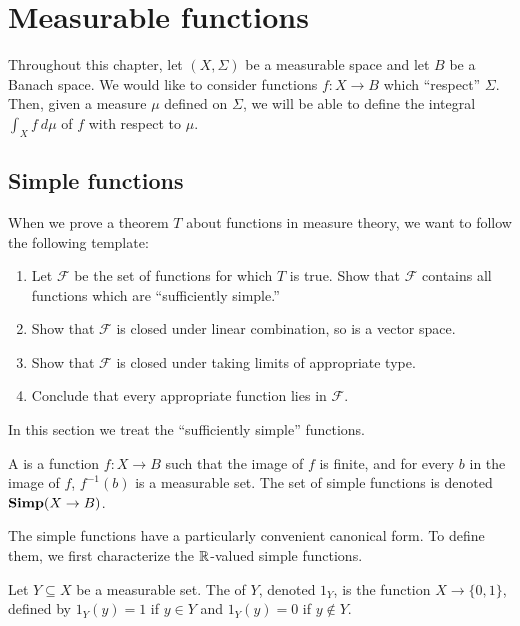 \chapter{Measurable functions}
Throughout this chapter, let $(X, \Sigma)$ be a measurable space and let $B$ be a Banach space.
We would like to consider functions $f: X \to B$ which ``respect'' $\Sigma$. Then, given a measure $\mu$ defined on $\Sigma$, we will be able to define the integral $\int_{X} f~d\mu$ of $f$ with respect to $\mu$.

\section{Simple functions}
When we prove a theorem $T$ about functions in measure theory, we want to follow the following template:
\begin{enumerate}
\item Let $\mathcal F$ be the set of functions for which $T$ is true. Show that $\mathcal F$ contains all functions which are ``sufficiently simple.''
\item Show that $\mathcal F$ is closed under linear combination, so is a vector space.
\item Show that $\mathcal F$ is closed under taking limits of appropriate type.
\item Conclude that every appropriate function lies in $\mathcal F$.
\end{enumerate}
In this section we treat the ``sufficiently simple'' functions.

\begin{definition}
A  is a function $f: X \to B$ such that the image of $f$ is finite, and for every $b$ in the image of $f$, $f^{-1}(b)$ is a measurable set.
The set of simple functions is denoted $\mathbf{Simp}(X \to B)$.
\end{definition}

\begin{subsec}
The simple functions have a particularly convenient canonical form.
To define them, we first characterize the $\mathbb{R}$-valued simple functions.
\end{subsec}

\begin{definition}
Let $Y \subseteq X$ be a measurable set. The  of $Y$, denoted $1_Y$, is the function $X \to \{0, 1\}$, defined by $1_Y(y) = 1$ if $y \in Y$ and $1_Y(y) = 0$ if $y \notin Y$.
\end{definition}

